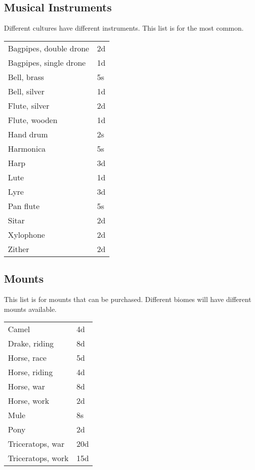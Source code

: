 \subsection{Musical Instruments}

Different cultures have different instruments. This list is for the most common.

\begin{center}
{
\begin{xtabular}{|l|l|}
Bagpipes, double drone & 2d \\
Bagpipes, single drone & 1d \\
Bell, brass & 5s \\
Bell, silver & 1d \\
Flute, silver & 2d \\
Flute, wooden & 1d \\
Hand drum & 2s \\
Harmonica & 5s \\
Harp & 3d \\
Lute & 1d \\
Lyre & 3d \\
Pan flute & 5s \\
Sitar & 2d \\
Xylophone & 2d \\
Zither & 2d \\
\hline
\end{xtabular}
}
\end{center}

\subsection{Mounts}

This list is for mounts that can be purchased. Different biomes will have different mounts available.

\begin{center}
{
\begin{xtabular}{|l|l|}
Camel & 4d \\
Drake, riding & 8d \\
Horse, race & 5d \\
Horse, riding & 4d \\
Horse, war & 8d \\
Horse, work & 2d \\
Mule & 8s \\
Pony & 2d \\
Triceratops, war & 20d \\
Triceratops, work & 15d \\
\hline
\end{xtabular}
}
\end{center}

